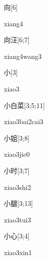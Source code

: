 \begin{verbete}[xiang4]{向}[6]
\begin{pronuncia}{xiang4}
\end{pronuncia}
\end{verbete}

\begin{verbete}{向汪}[6;7]
\begin{pronuncia}{xiang4wang3}
\end{pronuncia}
\end{verbete}

\begin{verbete}[xiao3]{小}[3]
\begin{pronuncia}{xiao3}
\end{pronuncia}
\end{verbete}

\begin{verbete}{小白菜}[3;5;11]
\begin{pronuncia}{xiao3bai2cai3}
\end{pronuncia}
\end{verbete}

\begin{verbete}{小姐}[3;8]
\begin{pronuncia}{xiao3jie0}
\end{pronuncia}
\end{verbete}

\begin{verbete}{小时}[3;7]
\begin{pronuncia}{xiao3shi2}
\end{pronuncia}
\end{verbete}

\begin{verbete}{小腿}[3;13]
\begin{pronuncia}{xiao3tui3}
\end{pronuncia}
\end{verbete}

\begin{verbete}{小心}[3;4]
\begin{pronuncia}{xiao3xin1}
\end{pronuncia}
\end{verbete}

